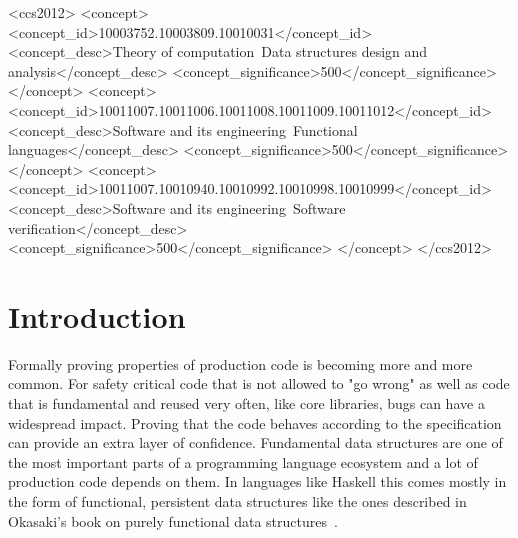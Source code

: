 \documentclass[sigplan,screen]{acmart}
\begin{document}
\begin{CCSXML}
<ccs2012>
   <concept>
       <concept_id>10003752.10003809.10010031</concept_id>
       <concept_desc>Theory of computation~Data structures design and analysis</concept_desc>
       <concept_significance>500</concept_significance>
       </concept>
   <concept>
       <concept_id>10011007.10011006.10011008.10011009.10011012</concept_id>
       <concept_desc>Software and its engineering~Functional languages</concept_desc>
       <concept_significance>500</concept_significance>
       </concept>
   <concept>
       <concept_id>10011007.10010940.10010992.10010998.10010999</concept_id>
       <concept_desc>Software and its engineering~Software verification</concept_desc>
       <concept_significance>500</concept_significance>
       </concept>
 </ccs2012>
\end{CCSXML}



\maketitle

\section{Introduction}

Formally proving properties of production code is becoming more and more common. For safety critical code that is not allowed to "go wrong" as well as code that is fundamental and reused very often, like core libraries, bugs can have a widespread impact. Proving that the code behaves according to the specification can provide an extra layer of confidence. Fundamental data structures are one of the most important parts of a programming language ecosystem and a lot of production code depends on them. In languages like Haskell this comes mostly in the form of functional, persistent data structures like the ones described in Okasaki's book on purely functional data structures~\cite{okasaki}.
\end{document}
